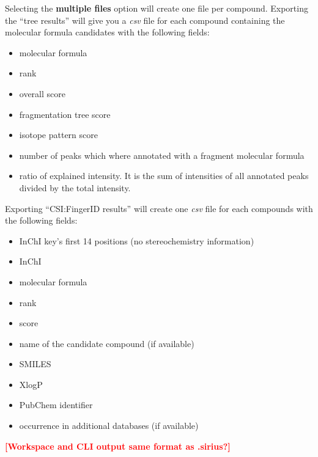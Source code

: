 \documentclass[letterpaper,10pt,openany,oneside]{sphinxmanual}
\newcommand{\todo}[1]{\xspace{\bfseries\sffamily\textcolor{red}{[#1]}}\xspace}
\begin{document}
Selecting the \textbf{multiple files} option will create one file per compound. Exporting the ``tree results'' will give you a \emph{csv} file for each compound containing the molecular formula candidates with the following fields: 
\begin{itemize}
\item molecular formula
\item rank
\item overall score
\item fragmentation tree score
\item isotope pattern score
\item number of peaks which where annotated with a fragment molecular formula
\item ratio of explained intensity. It is the sum of intensities of all annotated peaks divided by the total intensity.
\end{itemize}
Exporting ``CSI:FingerID results'' will create one \emph{csv} file for each compounds with the following fields:
\begin{itemize}
\item InChI key's first 14 positions (no stereochemistry information)
\item InChI
\item molecular formula
\item rank
\item score
\item name of the candidate compound (if available)
\item SMILES 
\item XlogP
\item PubChem identifier
\item occurrence in additional databases (if available)
\end{itemize}


\todo{Workspace and CLI output same format as .sirius?}


%
%
\end{document}
